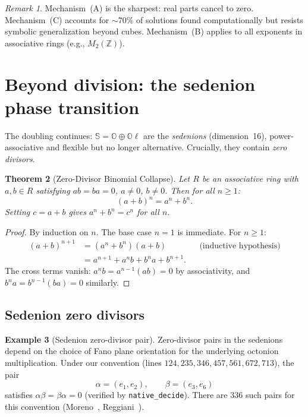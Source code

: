 \documentclass[11pt]{amsart}
\theoremstyle{plain}
\newtheorem{theorem}{Theorem}[section]
\theoremstyle{definition}
\newtheorem{example}[theorem]{Example}
\theoremstyle{remark}
\newtheorem{remark}[theorem]{Remark}
\newcommand{\Z}{\mathbb{Z}}
\newcommand{\OO}{\mathbb{O}}
\newcommand{\Se}{\mathbb{S}}
\begin{document}
\begin{remark}
Mechanism~(A) is the sharpest: real parts cancel to zero.
Mechanism~(C) accounts for $\sim$70\% of solutions found computationally
but resists symbolic generalization beyond cubes.
Mechanism~(B) applies to all exponents in associative rings (e.g., $M_2(\Z)$).
\end{remark}


\section{Beyond division: the sedenion phase transition}\label{sec:sedenion}

The doubling continues: $\Se = \OO \oplus \OO\ell$ are the \emph{sedenions}
(dimension~16), power-associative and flexible but no longer alternative.
Crucially, they contain \emph{zero divisors}.

\begin{theorem}[Zero-Divisor Binomial Collapse]\label{thm:zerodiv}
Let $R$ be an associative ring with $a, b \in R$ satisfying $ab = ba = 0$, $a \neq 0$, $b \neq 0$.
Then for all $n \geq 1$:
\[
  (a + b)^n = a^n + b^n.
\]
Setting $c = a + b$ gives $a^n + b^n = c^n$ for all $n$.
\end{theorem}

\begin{proof}
By induction on $n$. The base case $n = 1$ is immediate.
For $n \geq 1$:
\begin{align*}
  (a + b)^{n+1}
  &= (a^n + b^n)(a + b) && \text{(inductive hypothesis)} \\
  &= a^{n+1} + a^n b + b^n a + b^{n+1}.
\end{align*}
The cross terms vanish: $a^n b = a^{n-1}(ab) = 0$ by associativity,
and $b^n a = b^{n-1}(ba) = 0$ similarly.
\end{proof}

\subsection{Sedenion zero divisors}

\begin{example}[Sedenion zero-divisor pair]\label{ex:sedenion}
Zero-divisor pairs in the sedenions depend on the choice of Fano plane
orientation for the underlying octonion multiplication.
Under our convention (lines $124, 235, 346, 457, 561, 672, 713$),
the pair
\[
  \alpha = (e_1, e_2), \qquad \beta = (e_3, e_6)
\]
satisfies $\alpha\beta = \beta\alpha = 0$ (verified by \texttt{native\_decide}).
There are 336 such pairs for this convention
(Moreno~\cite{Moreno1998}, Reggiani~\cite{Reggiani2024}).
\end{example}
\end{document}
